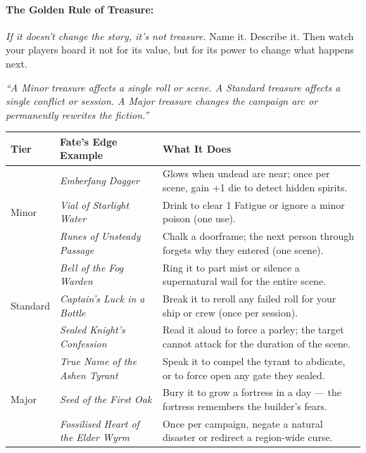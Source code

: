 \paragraph{The Golden Rule of Treasure:}
\emph{If it doesn't change the story, it's not treasure.} Name it. Describe it. Then watch your players hoard it not for its value, but for its power to change what happens next.

\begin{tcolorbox}[colback=yellow!5!white,colframe=yellow!70!black,title=Abstracted Treasure: The Leverage Standard,breakable]
  \emph{``A Minor treasure affects a single roll or scene. A Standard treasure affects a single conflict or session. A Major treasure changes the campaign arc or permanently rewrites the fiction.''}

  \vspace{2mm}

  \noindent
  \begin{tabular}{p{2.5cm}p{5cm}p{4.5cm}}
  \toprule
  \textbf{Tier} & \textbf{Fate's Edge Example} & \textbf{What It Does} \\
  \midrule
  \multirow{3}{2.5cm}{Minor}
  & \textit{Emberfang Dagger} & Glows when undead are near; once per scene, gain +1 die to detect hidden spirits. \\
  & \textit{Vial of Starlight Water} & Drink to clear 1 Fatigue or ignore a minor poison (one use). \\
  & \textit{Runes of Unsteady Passage} & Chalk a doorframe; the next person through forgets why they entered (one scene). \\
  \midrule
  \multirow{3}{2.5cm}{Standard}
  & \textit{Bell of the Fog Warden} & Ring it to part mist or silence a supernatural wail for the entire scene. \\
  & \textit{Captain's Luck in a Bottle} & Break it to reroll any failed roll for your ship or crew (once per session). \\
  & \textit{Sealed Knight's Confession} & Read it aloud to force a parley; the target cannot attack for the duration of the scene. \\
  \midrule
  \multirow{3}{2.5cm}{Major}
  & \textit{True Name of the Ashen Tyrant} & Speak it to compel the tyrant to abdicate, or to force open any gate they sealed. \\
  & \textit{Seed of the First Oak} & Bury it to grow a fortress in a day --- the fortress remembers the builder's fears. \\
  & \textit{Fossilised Heart of the Elder Wyrm} & Once per campaign, negate a natural disaster or redirect a region-wide curse. \\
  \bottomrule
  \end{tabular}


\end{tcolorbox}
